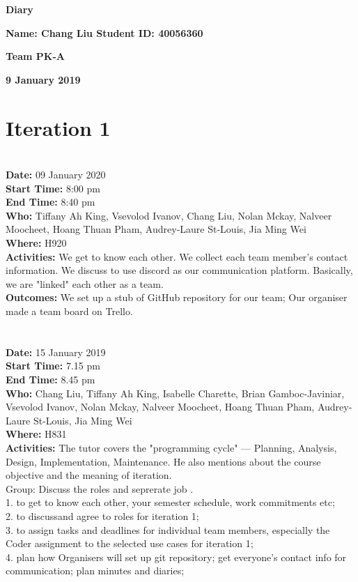 \documentclass[12pt]{article}
\begin{document}
\vspace*{0.2in}
\centerline{\bf\Large Diary}

\vspace*{0.2in}
\centerline{\bf\Large Name: Chang Liu Student ID: 40056360}

\vspace*{0.2in}
\centerline{\bf\Large Team PK-A}

\vspace*{0.2in}
\centerline{\bf\Large 9 January 2019}

\section{Iteration 1}\\
{\bf Date:} 09 January 2020\\
{\bf Start Time:} 8:00 pm\\
{\bf End Time:}  8:40 pm\\
{\bf Who:} Tiffany Ah King, Vsevolod Ivanov, Chang Liu, Nolan Mckay, Nalveer Moocheet, Hoang Thuan Pham, Audrey-Laure St-Louis, Jia Ming Wei\\
{\bf Where:} H920 \\
{\bf Activities:} We get to know each other. We collect each team member's contact information. We discuss to use discord as our communication platform. Basically, we are "linked" each other as a team.\\
{\bf Outcomes:}  We set up a stub of GitHub repository for our team; Our organiser made a team board on Trello. \\\\\\
{\bf Date:} 15 January 2019\\
{\bf Start Time:} 7.15 pm\\
{\bf End Time:} 8.45 pm \\
{\bf Who:} Chang Liu, Tiffany Ah King, Isabelle Charette, Brian Gamboc-Javiniar, Vsevolod Ivanov, Nolan Mckay, Nalveer Moocheet, Hoang Thuan Pham, Audrey-Laure St-Louis, Jia Ming Wei\\
{\bf Where:} H831 \\
{\bf Activities:} The tutor covers the "programming cycle" --- Planning, Analysis, Design, Implementation, Maintenance. He also mentions about the course objective and the meaning of iteration.\\Group: Discuss the roles and seprerate job
\s.\\ 1. to get to know each other, your semester schedule, work commitments etc;\\2. to discussand agree to roles for iteration 1;\\3. to assign tasks and deadlines for individual team members, especially the Coder assignment to the selected use cases for iteration 1;\\4. plan how Organisers will set up git repository; get everyone’s contact info for communication; plan minutes and diaries;\\
\end{document}
